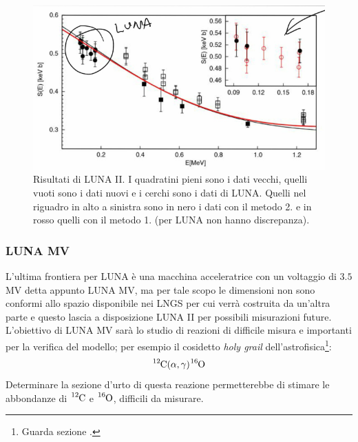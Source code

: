 \begin{figure}[!h]
	\centering
	\includegraphics[scale=0.7]{Immagini/0415_SE2.png}
	\caption{Risultati di LUNA II. I quadratini pieni sono i dati vecchi, quelli vuoti sono i dati nuovi e i cerchi sono i dati di LUNA. Quelli nel riguadro in alto a sinistra sono in nero i dati con il metodo 2. e in rosso quelli con il metodo 1. (per LUNA non hanno discrepanza).}
	\label{0415_lunaii}
\end{figure}

\subsubsection{LUNA MV}
L'ultima frontiera per LUNA è una macchina acceleratrice con un voltaggio di $3.5$ MV detta appunto LUNA MV, ma per tale scopo le dimensioni non sono conformi allo spazio disponibile nei LNGS per cui verrà costruita da un'altra parte e questo lascia a disposizione LUNA II per possibili misurazioni future. L'obiettivo di LUNA MV sarà lo studio di reazioni di difficile misura e importanti per la verifica del modello; per esempio il cosidetto \textit{holy grail} dell'astrofisica\footnote{Guarda sezione .}:
$$\ce{^{12}C(\alpha,\gamma)\ce{^{16}O}}$$
Determinare la sezione d'urto di questa reazione permetterebbe di stimare le abbondanze di $\ce{^{12}C}$ e $\ce{^{16}O}$, difficili da misurare.

